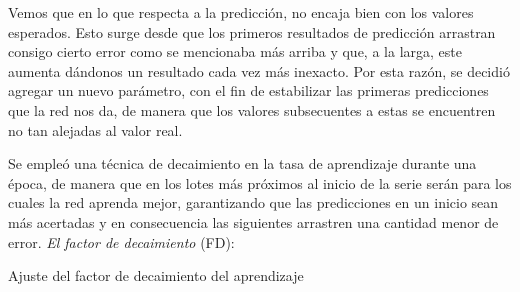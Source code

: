 Vemos que en lo que respecta a la predicción, no encaja bien con los valores esperados. Esto surge desde que los primeros resultados de predicción arrastran consigo cierto error como se mencionaba más arriba y que, a la larga, este aumenta dándonos un resultado cada vez más inexacto. Por esta razón, se decidió agregar un nuevo parámetro, con el fin de estabilizar las primeras predicciones que la red nos da, de manera que los valores subsecuentes a estas se encuentren no tan alejadas al valor real.

Se empleó una técnica de decaimiento en la tasa de aprendizaje durante una época, de manera que en los lotes más próximos al inicio de la serie serán para los cuales la red aprenda mejor, garantizando que las predicciones en un inicio sean más acertadas y en consecuencia las siguientes arrastren una cantidad menor de error. \textit{El factor de decaimiento} (FD):

\begin{algorithm}[H]{
\caption{Ajuste del factor de decaimiento del aprendizaje}
\SetAlgoLined
{}



\BlankLine
\BlankLine

}
\end{algorithm}


